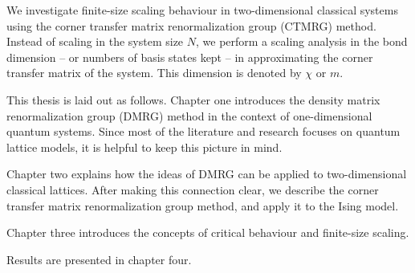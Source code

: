 We investigate finite-size scaling behaviour in two-dimensional classical systems using
the corner transfer matrix renormalization group (CTMRG) method. Instead of scaling in the
system size $N$, we perform a scaling analysis in the bond dimension -- or numbers of
basis states kept -- in approximating the corner transfer matrix of the system. This
dimension is denoted by $\chi$ or $m$.

This thesis is laid out as follows. Chapter one introduces the density matrix
renormalization group (DMRG) method in the context of one-dimensional quantum systems.
Since most of the literature and research focuses on quantum lattice models, it is helpful
to keep this picture in mind.

Chapter two explains how the ideas of DMRG can be applied to two-dimensional classical
lattices. After making this connection clear, we describe the corner transfer matrix
renormalization group method, and apply it to the Ising model.

Chapter three introduces the concepts of critical behaviour and finite-size scaling.

Results are presented in chapter four.

